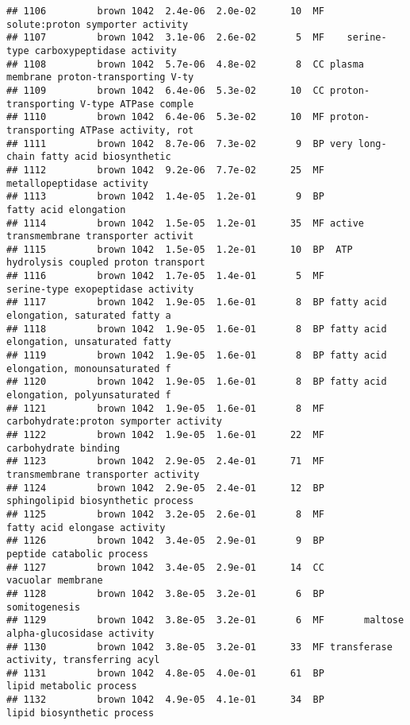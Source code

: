 \documentclass[]{article}
\begin{document}
\begin{verbatim}
## 1106         brown 1042  2.4e-06  2.0e-02      10  MF         solute:proton symporter activity
## 1107         brown 1042  3.1e-06  2.6e-02       5  MF    serine-type carboxypeptidase activity
## 1108         brown 1042  5.7e-06  4.8e-02       8  CC plasma membrane proton-transporting V-ty
## 1109         brown 1042  6.4e-06  5.3e-02      10  CC proton-transporting V-type ATPase comple
## 1110         brown 1042  6.4e-06  5.3e-02      10  MF proton-transporting ATPase activity, rot
## 1111         brown 1042  8.7e-06  7.3e-02       9  BP very long-chain fatty acid biosynthetic 
## 1112         brown 1042  9.2e-06  7.7e-02      25  MF                metallopeptidase activity
## 1113         brown 1042  1.4e-05  1.2e-01       9  BP                    fatty acid elongation
## 1114         brown 1042  1.5e-05  1.2e-01      35  MF active transmembrane transporter activit
## 1115         brown 1042  1.5e-05  1.2e-01      10  BP  ATP hydrolysis coupled proton transport
## 1116         brown 1042  1.7e-05  1.4e-01       5  MF        serine-type exopeptidase activity
## 1117         brown 1042  1.9e-05  1.6e-01       8  BP fatty acid elongation, saturated fatty a
## 1118         brown 1042  1.9e-05  1.6e-01       8  BP fatty acid elongation, unsaturated fatty
## 1119         brown 1042  1.9e-05  1.6e-01       8  BP fatty acid elongation, monounsaturated f
## 1120         brown 1042  1.9e-05  1.6e-01       8  BP fatty acid elongation, polyunsaturated f
## 1121         brown 1042  1.9e-05  1.6e-01       8  MF   carbohydrate:proton symporter activity
## 1122         brown 1042  1.9e-05  1.6e-01      22  MF                     carbohydrate binding
## 1123         brown 1042  2.9e-05  2.4e-01      71  MF       transmembrane transporter activity
## 1124         brown 1042  2.9e-05  2.4e-01      12  BP        sphingolipid biosynthetic process
## 1125         brown 1042  3.2e-05  2.6e-01       8  MF             fatty acid elongase activity
## 1126         brown 1042  3.4e-05  2.9e-01       9  BP                peptide catabolic process
## 1127         brown 1042  3.4e-05  2.9e-01      14  CC                        vacuolar membrane
## 1128         brown 1042  3.8e-05  3.2e-01       6  BP                            somitogenesis
## 1129         brown 1042  3.8e-05  3.2e-01       6  MF       maltose alpha-glucosidase activity
## 1130         brown 1042  3.8e-05  3.2e-01      33  MF transferase activity, transferring acyl 
## 1131         brown 1042  4.8e-05  4.0e-01      61  BP                  lipid metabolic process
## 1132         brown 1042  4.9e-05  4.1e-01      34  BP               lipid biosynthetic process

\end{verbatim}
\end{document}
